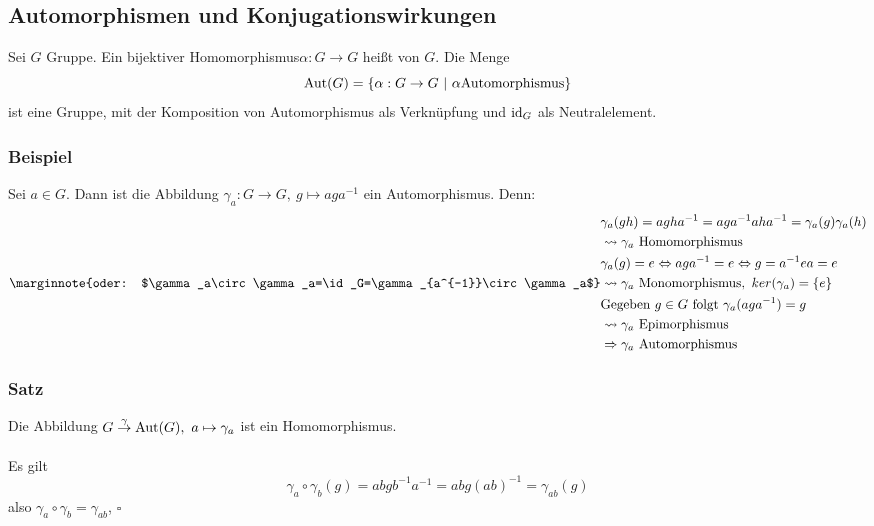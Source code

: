 
\subsection{Automorphismen und Konjugationswirkungen}
\label{sub:automor}
Sei $G$ Gruppe. Ein bijektiver Homomorphismus$\alpha:G\to G$ heißt  von $G$. Die Menge \[\operatorname{Aut}(G)=\{\alpha:G\to G~|~\alpha \text{Automorphismus}\} \] 
ist eine Gruppe, mit der Komposition von Automorphismus als Verknüpfung und $\operatorname{id}_G$ als Neutralelement.

\subsubsection*{Beispiel}
Sei $a\in G$. Dann ist die Abbildung $\gamma_a:G\to G,~g\mapsto aga^{-1}$ ein Automorphismus. Denn:
\begin{equation*}
\begin{aligned}
	&\gamma_a(gh)=agha^{-1}=aga^{-1}aha^{-1}=\gamma_a(g)\gamma_a(h)\\
	&\rightsquigarrow \gamma_a \text{ Homomorphismus}\\
	&\gamma_a(g)=e \Leftrightarrow aga^{-1}=e \Leftrightarrow g=a^{-1}ea=e\\
	\marginnote{oder: $\gamma_a\circ\gamma_a=\id_G=\gamma_{a^{-1}}\circ\gamma_a$}
	&\rightsquigarrow \gamma_a \text{ Monomorphismus},~ker(\gamma_a)=\{e\}\\
	&\text{Gegeben } g\in G \text{ folgt } \gamma_a(aga^{-1})=g\\
	&\rightsquigarrow \gamma_a \text{ Epimorphismus}\\
	&\Rightarrow \gamma_a \text{ Automorphismus}
\end{aligned}
\end{equation*}

\subsubsection*{Satz}
Die Abbildung $G\stackrel{\gamma}{\to} \operatorname{Aut}(G),~a\mapsto \gamma_a$ ist ein Homomorphismus.\\

\\
Es gilt \[\gamma_a\circ\gamma_b(g)=abgb^{-1}a^{-1}=abg(ab)^{-1}=\gamma_{ab}(g) \]
also $\gamma_a\circ\gamma_b=\gamma_{ab}$,
\hfill $\square$\\

